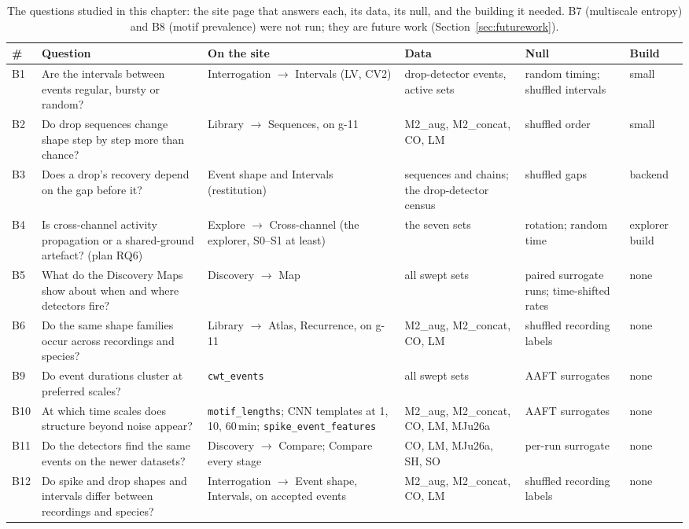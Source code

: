 \begin{table}[htbp]
\caption[{The questions studied in this chapter.}]{The questions studied in this chapter: the site page that answers each, its data, its null, and the building it needed. B7 (multiscale entropy) and B8 (motif prevalence) were not run; they are future work (Section~\ref{sec:futurework}).}
\label{tab:roundb}
\footnotesize
\begin{tabularx}{\textwidth}{@{}l >{\raggedright\arraybackslash}X >{\raggedright\arraybackslash}p{3.1cm} >{\raggedright\arraybackslash}p{2.5cm} >{\raggedright\arraybackslash}p{2.3cm} >{\raggedright\arraybackslash}p{1.5cm}@{}}
\toprule
\textbf{\#} & \textbf{Question} & \textbf{On the site} & \textbf{Data} & \textbf{Null} & \textbf{Build}\\
\midrule
B1 & Are the intervals between events regular, bursty or random? & Interrogation $\rightarrow$ Intervals (LV, CV2) & drop-detector events, active sets & random timing; shuffled intervals & small\\
B2 & Do drop sequences change shape step by step more than chance? & Library $\rightarrow$ Sequences, on g-11 & M2\_aug, M2\_concat, CO, LM & shuffled order & small\\
B3 & Does a drop's recovery depend on the gap before it? & Event shape and Intervals (restitution) & sequences and chains; the drop-detector census & shuffled gaps & backend\\
B4 & Is cross-channel activity propagation or a shared-ground artefact? (plan RQ6) & Explore $\rightarrow$ Cross-channel (the explorer, S0--S1 at least) & the seven sets & rotation; random time & explorer build\\
B5 & What do the Discovery Maps show about when and where detectors fire? & Discovery $\rightarrow$ Map & all swept sets & paired surrogate runs; time-shifted rates & none\\
B6 & Do the same shape families occur across recordings and species? & Library $\rightarrow$ Atlas, Recurrence, on g-11 & M2\_aug, M2\_concat, CO, LM & shuffled recording labels & none\\
B9 & Do event durations cluster at preferred scales? & \texttt{cwt\_events} & all swept sets & AAFT surrogates & none\\
B10 & At which time scales does structure beyond noise appear? & \texttt{motif\_lengths}; CNN templates at 1, 10, 60\,min; \texttt{spike\_event\_\allowbreak features} & M2\_aug, M2\_concat, CO, LM, MJu26a & AAFT surrogates & none\\
B11 & Do the detectors find the same events on the newer datasets? & Discovery $\rightarrow$ Compare; Compare every stage & CO, LM, MJu26a, SH, SO & per-run surrogate & none\\
B12 & Do spike and drop shapes and intervals differ between recordings and species? & Interrogation $\rightarrow$ Event shape, Intervals, on accepted events & M2\_aug, M2\_concat, CO, LM & shuffled recording labels & none\\
\bottomrule
\end{tabularx}
\end{table}

